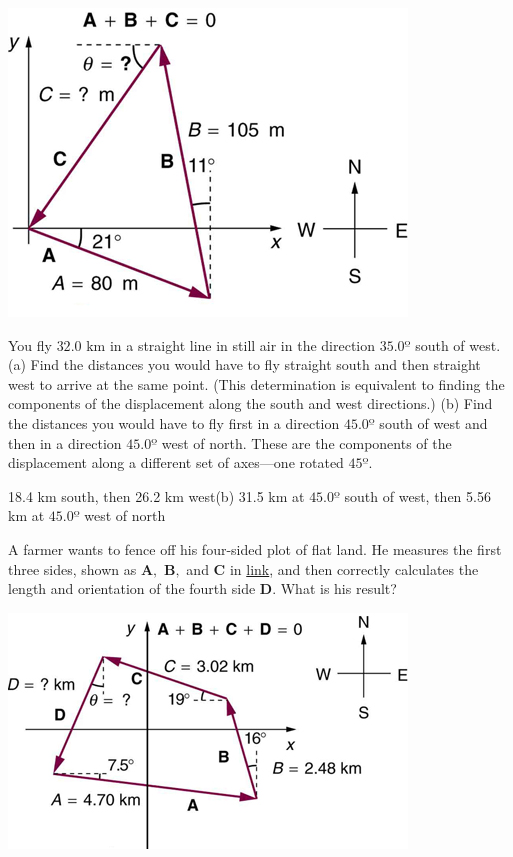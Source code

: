 \documentclass[
]{book}
\newenvironment{problems-exercises}{}{}
\begin{document}
\begin{problems-exercises}
\includegraphics{images/Figure_03_03_11a.jpg}

\hypertarget{fs-id1874820}{}
\leavevmode\hypertarget{fs-id1874821}{}%
You fly \({\text{32}\text{.}\text{0\ km}}{}\) in a straight line in still
air in the direction \(35.0º{}\) south of west. (a) Find the distances you
would have to fly straight south and then straight west to arrive at the
same point. (This determination is equivalent to finding the components
of the displacement along the south and west directions.) (b) Find the
distances you would have to fly first in a direction \(45.0º{}\) south of
west and then in a direction \(45.0º{}\) west of north. These are the
components of the displacement along a different set of axes---one
rotated \(45º{}\).

\leavevmode\hypertarget{fs-id1797961}{}%
18.4 km south, then 26.2 km west(b) 31.5 km at \(45.0º{}\) south of west,
then 5.56 km at \(45.0º{}\) west of north

\hypertarget{eip-379}{}
\leavevmode\hypertarget{eip-201}{}%
A farmer wants to fence off his four-sided plot of flat land. He
measures the first three sides, shown as \({\mathbf{A},}{}\)
\({\mathbf{B},}{}\) and \(\mathbf{C}{}\) in
\protect\hyperlink{import-auto-id1165298543237}{link}, and then
correctly calculates the length and orientation of the fourth side
\(\mathbf{D}{}\). What is his result?

\includegraphics{images/Figure_03_03_12a.jpg}


\end{problems-exercises}
\end{document}
